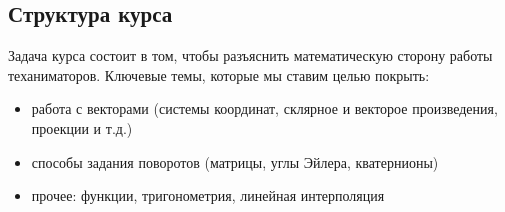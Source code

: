 \documentclass[a4paper,12pt]{article}
\newcounter{z-counter}
\begin{document}







\subsection*{Структура курса}

Задача курса состоит в том, чтобы разъяснить математическую сторону работы теханиматоров. Ключевые темы, которые мы ставим целью покрыть:
\begin{itemize}
    \item работа с векторами (системы координат, склярное и векторое произведения, проекции и т.д.)
    \item способы задания поворотов (матрицы, углы Эйлера, кватернионы)
    \item прочее: функции, тригонометрия, линейная интерполяция
\end{itemize}
\end{document}
